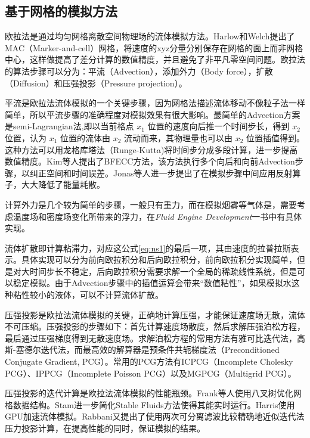 \subsection{基于网格的模拟方法}

    欧拉法是通过均匀网格离散空间物理场的流体模拟方法。Harlow和Welch\cite{HW65MAC}提出了MAC（Marker-and-cell）网格，将速度的xyz分量分别保存在网格的面上而非网格中心，这样做提高了差分计算的数值精度，并且避免了非平凡零空间问题。欧拉法的算法步骤可以分为：平流（Advection），添加外力（Body force），扩散（Diffusion）和压强投影（Pressure projection）。

    平流是欧拉法流体模拟的一个关键步骤，因为网格法描述流体移动不像粒子法一样简单，所以平流步骤的准确程度对模拟效果有很大影响。最简单的Advection方案是semi-Lagrangian法,即以当前格点 $x_1$ 位置的速度向后推一个时间步长，得到 $x_2$ 位置，认为 $x_1$ 位置的流体由 $x_2$ 流动而来，其物理量也可以由 $x_2$ 位置插值得到。这种方法可以用龙格库塔法（Runge-Kutta)将时间步分成多段计算，进一步提高数值精度。Kim\cite{KLL06BFECC}等人提出了BFECC方法，该方法执行多个向后和向前Advection步骤，以纠正空间和时间误差。Jonas\cite{ZNT18AR}等人进一步提出了在模拟步骤中间应用反射算子，大大降低了能量耗散。

    计算外力是几个较为简单的步骤，一般只有重力，而在模拟烟雾等气体是，需要考虑温度场和密度场变化所带来的浮力，在\textit{Fluid Engine Development}一书中有具体实现\cite{K17Fluid}。

    流体扩散即计算粘滞力，对应这公式\ref{eq:ns1}的最后一项，其由速度的拉普拉斯表示。具体实现可以分为前向欧拉积分和后向欧拉积分，前向欧拉积分实现简单，但是对大时间步长不稳定，后向欧拉积分需要求解一个全局的稀疏线性系统，但是可以稳定模拟。由于Advection步骤中的插值运算会带来“数值粘性”，如果模拟水这种粘性较小的液体，可以不计算流体扩散。
    
    压强投影是欧拉法流体模拟的关键，正确地计算压强，才能保证速度场无散，流体不可压缩。压强投影的步骤如下：首先计算速度场散度，然后求解压强泊松方程，最后通过压强梯度得到无散速度场。求解泊松方程的常用方法有雅可比迭代法，高斯-塞德尔迭代法，而最高效的解算器是预条件共轭梯度法（Preconditioned Conjugate Gradient, PCG）\cite{HK12IPPCG}。常用的PCG方法有ICPCG（Incomplete Cholesky PCG）、IPPCG（Incomplete Poisson PCG）\cite{HK12IPPCG}以及MGPCG（Multigrid PCG）\cite{MST10MGPCG}。
    
    压强投影的迭代计算是欧拉法流体模拟的性能瓶颈。Frank\cite{LGF04EM}等人使用八叉树优化网格数据结构。Stam\cite{S03EM}进一步简化Stable Fluids方法使得其能实时运行。Harris\cite{H05EM}使用GPU加速流体模拟。Rabbani\cite{RGR22CPF}又提出了使用两次可分离滤波比较精确地近似迭代法压力投影计算，在提高性能的同时，保证模拟的结果。

